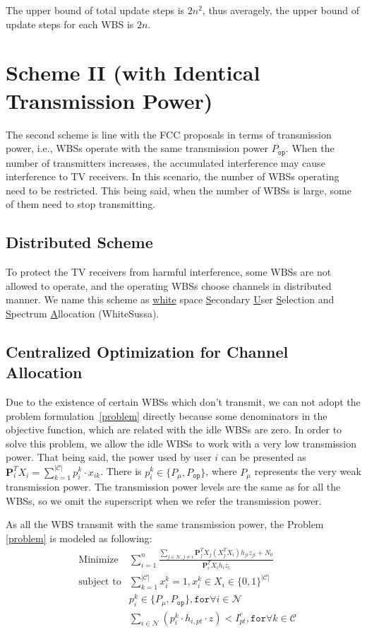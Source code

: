 \documentclass[times]{ettauth}
\newcommand{\ie}{i.e., }
\theoremstyle{mytheoremstyle}
\theoremstyle{mytheoremstyle}
\theoremstyle{mytheoremstyle}
\renewcommand{\vec}[1]{\mathbf{#1}}
\begin{document}
The upper bound of total update steps is $2n^2$, thus averagely, the upper bound of update steps for each WBS is $2n$.

\section{Scheme II (with Identical Transmission Power)}
\label{schemeII}
The second scheme is line with the FCC proposals in terms of transmission power, \ie WBSs operate with the same transmission power $P_{\mathtt{op}}$.
When the number of transmitters increases, the accumulated interference may cause interference to TV receivers.
In this scenario, the number of WBSs operating need to be restricted.
This being said, when the number of WBSs is large, some of them need to stop transmitting.
\subsection{Distributed Scheme}
To protect the TV receivers from harmful interference, some WBSs are not allowed to operate, and the operating WBSs choose channels in distributed manner.
We name this scheme as \underline{white} space \underline{S}econdary \underline{U}ser \underline{S}election and \underline{S}pectrum \underline{A}llocation (WhiteSussa). 

\subsection{Centralized Optimization for Channel Allocation}
Due to the existence of certain WBSs which don't transmit, we can not adopt the problem formulation~\ref{problem} directly because some denominators in the objective function, which are related with the idle WBSs are zero.
In order to solve this problem, we allow the idle WBSs to work with a very low transmission power.
That being said, the power used by user $i$ can be presented as $\vec{P}_i^T X_i = \sum\limits_{k=1}^{|\mathcal{C}|}p_i^k\cdot x_{ik}$.
There is $p_i^k\in \{P_\mu, P_{\mathtt{op}}\}$, where $P_\mu$ represents the very weak transmission power.
The transmission power levels are the same as for all the WBSs, so we omit the superscript when we refer the transmission power.

As all the WBS transmit with the same transmission power, the Problem \ref{problem} is modeled as following:
	\begin{equation}
\label{QLP}
		\begin{aligned}
		& \underset{}{\text{Minimize}}
		&  \sum\limits^{n}_{i=1} \frac{\sum\limits_{j\in\mathcal{N}, j\neq i}\vec{P}_j^TX_j(X_j^TX_i)h_{ji}z_{ji} + N_0}{\vec{P}_i^TX_ih_iz_i}\\
		& \text{subject to}
		&  \sum\limits_{k=1}^{|\mathcal{C}|}x_i^k=1, x_i^k\in X_i\in \{0,1\}^{|\mathcal{C}|}\\
		& & p_i^k\in \{P_\mu, P_{\mathtt{op}}\}, \mathtt{for} \forall i\in \mathcal{N}\\
     	& & \sum_{i\in \mathcal{N}} (p^k_i \cdot h_{i,pt}\cdot z) < I^c_{pt},  \mathtt{for} \forall k\in \mathcal{C} 
		\end{aligned}
	\end{equation}
	
\end{document}
